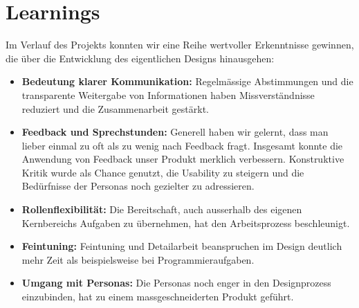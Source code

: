 \section{Learnings}
Im Verlauf des Projekts konnten wir eine Reihe wertvoller Erkenntnisse gewinnen, die über die Entwicklung des eigentlichen Designs hinausgehen:

\begin{itemize}
	\item \textbf{Bedeutung klarer Kommunikation:} Regelmässige Abstimmungen und die transparente Weitergabe von Informationen haben Missverständnisse reduziert und die Zusammenarbeit gestärkt.
	\item \textbf{Feedback und Sprechstunden:} Generell haben wir gelernt, dass man lieber einmal zu oft als zu wenig nach Feedback fragt. Insgesamt konnte die Anwendung von Feedback unser Produkt merklich verbessern. Konstruktive Kritik wurde als Chance genutzt, die Usability zu steigern und die Bedürfnisse der Personas noch gezielter zu adressieren.
	\item \textbf{Rollenflexibilität:} Die Bereitschaft, auch ausserhalb des eigenen Kernbereichs Aufgaben zu übernehmen, hat den Arbeitsprozess beschleunigt.
	\item \textbf{Feintuning:} Feintuning und Detailarbeit beanspruchen im Design deutlich mehr Zeit als beispielsweise bei Programmieraufgaben.
	\item \textbf{Umgang mit Personas:} Die Personas noch enger in den Designprozess einzubinden, hat zu einem massgeschneiderten Produkt geführt.
\end{itemize}

\newpage

